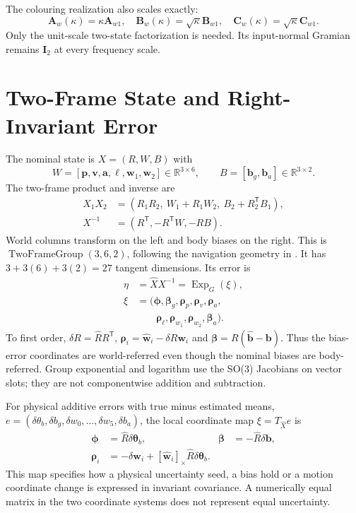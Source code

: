 \documentclass[conference]{IEEEtran}
\newcommand{\vc}[1]{\bm{#1}}
\newcommand{\mt}[1]{\bm{#1}}
\newcommand{\R}{\mathbb R}
\newcommand{\tr}{^{\mathsf T}}
\newcommand{\sk}[1]{[#1]_\times}
\begin{document}
The colouring realization also scales exactly:
\begin{equation}
 \mt A_w(\kappa)=\kappa\mt A_{w1},\quad
 \mt B_w(\kappa)=\sqrt\kappa\mt B_{w1},\quad
 \mt C_w(\kappa)=\sqrt\kappa\mt C_{w1}.
 \label{eq:colourscale}
\end{equation}
Only the unit-scale two-state factorization is needed. Its input-normal
Gramian remains $\mt I_2$ at every frequency scale.


\section{Two-Frame State and Right-Invariant Error}
\label{sec:geometry}
The nominal state is $X=(R,W,B)$ with
\begin{equation}
 W=[\vc p,\vc v,\vc a,\vc\ell,\vc w_1,\vc w_2]\in\R^{3\times6},
 \qquad B=[\vc b_g,\vc b_a]\in\R^{3\times2}.
\end{equation}
The two-frame product and inverse are
\begin{align}
 X_1X_2&=(R_1R_2,\ W_1+R_1W_2,\ B_2+R_2\tr B_1),\\
 X^{-1}&=(R\tr,-R\tr W,-RB).
\end{align}
World columns transform on the left and body biases on the right. This is
$\operatorname{TwoFrameGroup}(3,6,2)$, following the navigation geometry in
\cite{barrau}. It has $3+3(6)+3(2)=27$ tangent dimensions. Its error is
\begin{align}
 \eta&=\hat X X^{-1}=\operatorname{Exp}_G(\xi),\\
 \xi&=(\vc\phi,\vc\beta_g,\vc\rho_p,\vc\rho_v,\vc\rho_a,\nonumber\\
 &\qquad\vc\rho_\ell,\vc\rho_{w_1},\vc\rho_{w_2},\vc\beta_a).
\end{align}
To first order, $\delta R=\hat R R\tr$,
$\vc\rho_i=\hat{\vc w}_i-\delta R\vc w_i$ and
$\vc\beta=R(\hat{\vc b}-\vc b)$. Thus the bias-error coordinates are
world-referred even though the nominal biases are body-referred. Group
exponential and logarithm use the SO(3) Jacobians on vector slots; they are
not componentwise addition and subtraction.

For physical additive errors with true minus estimated means,
$e=(\delta\theta_b,\delta b_g,\delta w_0,\ldots,\delta w_5,\delta b_a)$,
the local coordinate map $\xi=T_{\hat X}e$ is
\begin{align}
 \vc\phi&=\hat R\delta\vc\theta_b,&\vc\beta&=-\hat R\delta\vc b,\\
 \vc\rho_i&=-\delta\vc w_i+\sk{\hat{\vc w}_i}\hat R\delta\vc\theta_b.
 \label{eq:physicalmap}
\end{align}
This map specifies how a physical uncertainty seed, a bias hold or a motion
coordinate change is expressed in invariant covariance. A numerically equal
matrix in the two coordinate systems does not represent equal uncertainty.
\end{document}
